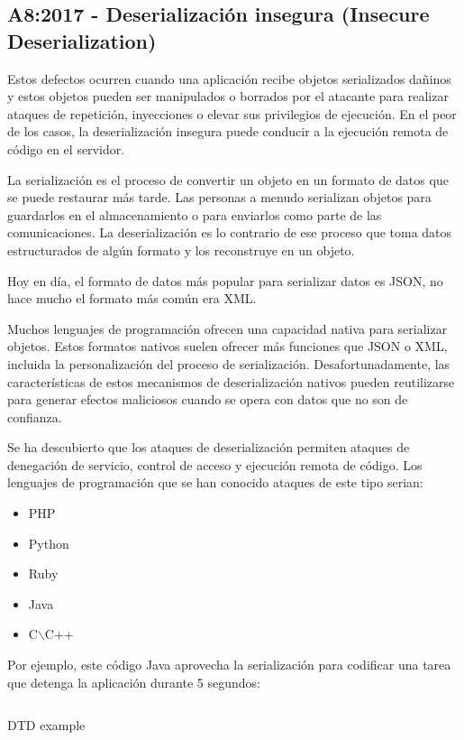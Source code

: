 \subsection{A8:2017 - Deserialización insegura (Insecure Deserialization) }

Estos defectos ocurren cuando una aplicación recibe objetos serializados dañinos y estos objetos
pueden ser manipulados o borrados por el atacante para realizar ataques de repetición,
inyecciones o elevar sus privilegios de ejecución. En el peor de los casos, la deserialización
insegura puede conducir a la ejecución remota de código en el servidor. 

La serialización es el proceso de convertir un objeto en un formato de datos que se puede restaurar 
más tarde. Las personas a menudo serializan objetos para guardarlos en el almacenamiento o para enviarlos 
como parte de las comunicaciones. La deserialización es lo contrario de ese proceso que toma datos
estructurados de algún formato y los reconstruye en un objeto.

Hoy en día, el formato de datos más popular para serializar datos es JSON, no hace mucho el 
formato más común era XML.

Muchos lenguajes de programación ofrecen una capacidad nativa para serializar objetos. Estos formatos 
nativos suelen ofrecer más funciones que JSON o XML, incluida la personalización del proceso de 
serialización. Desafortunadamente, las características de estos mecanismos de deserialización 
nativos pueden reutilizarse para generar efectos maliciosos cuando se opera con datos que no son de confianza.

Se ha descubierto que los ataques de deserialización permiten ataques de denegación de servicio, control 
de acceso y ejecución remota de código. Los lenguajes de programación que se han conocido ataques de este 
tipo serian:

\begin{itemize}
    \item PHP
    \item Python
    \item Ruby
    \item Java
    \item C$\backslash$C++
\end{itemize}

Por ejemplo, este código Java aprovecha la serialización para codificar una tarea que detenga 
la aplicación durante 5 segundos:

\begin{listing}[h]
    \inputminted{java}{./Ficheros/Serialize.java}
    \caption{DTD example}
    \label{listing:2}
\end{listing}

